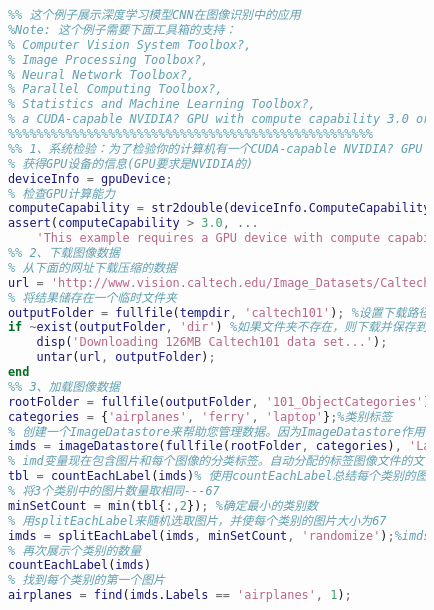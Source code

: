            \begin{lstlisting}[language = Matlab]
            %%%%%%%%%%%%%%%%%%%%%%%%%%%%%%%%%%%%%%%%%%%%%%%%%%%
            %% 这个例子展示深度学习模型CNN在图像识别中的应用
            %Note: 这个例子需要下面工具箱的支持：
            % Computer Vision System Toolbox?,
            % Image Processing Toolbox?,
            % Neural Network Toolbox?,
            % Parallel Computing Toolbox?,
            % Statistics and Machine Learning Toolbox?,
            % a CUDA-capable NVIDIA? GPU with compute capability 3.0 or higher.
            %%%%%%%%%%%%%%%%%%%%%%%%%%%%%%%%%%%%%%%%%%%%%%%%%%%
            %% 1、系统检验：为了检验你的计算机有一个CUDA-capable NVIDIA? GPU with compute capability 3.0 or higher.
            % 获得GPU设备的信息(GPU要求是NVIDIA的)
            deviceInfo = gpuDevice;
            % 检查GPU计算能力
            computeCapability = str2double(deviceInfo.ComputeCapability);
            assert(computeCapability > 3.0, ...
                'This example requires a GPU device with compute capability 3.0 or higher.')
            %% 2、下载图像数据
            % 从下面的网址下载压缩的数据
            url = 'http://www.vision.caltech.edu/Image_Datasets/Caltech101/101_ObjectCategories.tar.gz';
            % 将结果储存在一个临时文件夹
            outputFolder = fullfile(tempdir, 'caltech101'); %设置下载路径(图像数据下载在哪里)
            if ~exist(outputFolder, 'dir') %如果文件夹不存在，则下载并保存到该文件夹路径
                disp('Downloading 126MB Caltech101 data set...');
                untar(url, outputFolder);
            end
            %% 3、加载图像数据
            rootFolder = fullfile(outputFolder, '101_ObjectCategories');
            categories = {'airplanes', 'ferry', 'laptop'};%类别标签
            % 创建一个ImageDatastore来帮助您管理数据。因为ImageDatastore作用于图像文件位置,图像不加载到内存中,直到读,使其有效使用大型图像集合。
            imds = imageDatastore(fullfile(rootFolder, categories), 'LabelSource', 'foldernames');
            % imd变量现在包含图片和每个图像的分类标签。自动分配的标签图像文件的文件夹的名称。
            tbl = countEachLabel(imds)% 使用countEachLabel总结每个类别的图片数量。
            % 将3个类别中的图片数量取相同---67
            minSetCount = min(tbl{:,2}); %确定最小的类别数
            % 用splitEachLabel来随机选取图片，并使每个类别的图片大小为67
            imds = splitEachLabel(imds, minSetCount, 'randomize');%imds包含图片和类别
            % 再次展示个类别的数量
            countEachLabel(imds)
            % 找到每个类别的第一个图片
            airplanes = find(imds.Labels == 'airplanes', 1);

\end{lstlisting}
